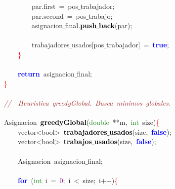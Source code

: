 \mbox{}\ \ \ \ \ \ \ \ par\textcolor{BrickRed}{.}first\ \textcolor{BrickRed}{=}\ pos$\_$trabajador\textcolor{BrickRed}{;}\  \\
\mbox{}\ \ \ \ \ \ \ \ par\textcolor{BrickRed}{.}second\ \textcolor{BrickRed}{=}\ pos$\_$trabajo\textcolor{BrickRed}{;}\  \\
\mbox{}\ \ \ \ \ \ \ \ asignacion$\_$final\textcolor{BrickRed}{.}\textbf{\textcolor{Black}{push$\_$back}}\textcolor{BrickRed}{(}par\textcolor{BrickRed}{);}\  \\
\mbox{} \\
\mbox{}\ \ \ \ \ \ \ \ trabajadores$\_$usados\textcolor{BrickRed}{[}pos$\_$trabajador\textcolor{BrickRed}{]}\ \textcolor{BrickRed}{=}\ \textbf{\textcolor{Blue}{true}}\textcolor{BrickRed}{;}\  \\
\mbox{}\ \ \ \ \textcolor{Red}{\}} \\
\mbox{} \\
\mbox{}\ \ \ \ \textbf{\textcolor{Blue}{return}}\ asignacion$\_$final\textcolor{BrickRed}{;}\  \\
\mbox{}\textcolor{Red}{\}} \\
\mbox{} \\
\mbox{}\textit{\textcolor{Brown}{//\ \ Heurística\ greedyGlobal.\ Busca\ mínimos\ globales.\ }} \\
\mbox{} \\
\mbox{}\textcolor{TealBlue}{Asignacion}\ \textbf{\textcolor{Black}{greedyGlobal}}\textcolor{BrickRed}{(}\textcolor{ForestGreen}{double}\ \textcolor{BrickRed}{**}m\textcolor{BrickRed}{,}\ \textcolor{ForestGreen}{int}\ size\textcolor{BrickRed}{)}\textcolor{Red}{\{} \\
\mbox{}\ \ \ \ \textcolor{TealBlue}{vector\textless{}bool\textgreater{}}\ \textbf{\textcolor{Black}{trabajadores$\_$usados}}\textcolor{BrickRed}{(}size\textcolor{BrickRed}{,}\ \textbf{\textcolor{Blue}{false}}\textcolor{BrickRed}{);} \\
\mbox{}\ \ \ \ \textcolor{TealBlue}{vector\textless{}bool\textgreater{}}\ \textbf{\textcolor{Black}{trabajos$\_$usados}}\textcolor{BrickRed}{(}size\textcolor{BrickRed}{,}\ \textbf{\textcolor{Blue}{false}}\textcolor{BrickRed}{);} \\
\mbox{} \\
\mbox{}\ \ \ \ \textcolor{TealBlue}{Asignacion}\ asignacion$\_$final\textcolor{BrickRed}{;}\  \\
\mbox{} \\
\mbox{}\ \ \ \ \textbf{\textcolor{Blue}{for}}\ \textcolor{BrickRed}{(}\textcolor{ForestGreen}{int}\ i\ \textcolor{BrickRed}{=}\ \textcolor{Purple}{0}\textcolor{BrickRed}{;}\ i\ \textcolor{BrickRed}{\textless{}}\ size\textcolor{BrickRed}{;}\ i\textcolor{BrickRed}{++)}\textcolor{Red}{\{}\ \ \ \ \ \ \ \  \\
